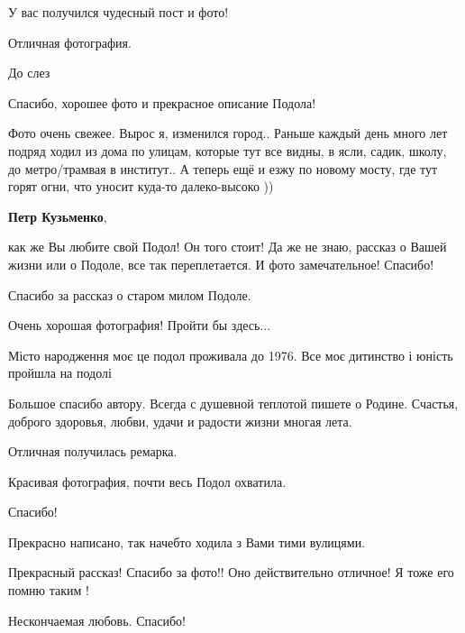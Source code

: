\begin{itemize}
У вас получился чудесный пост и фото!


Отличная фотография.

До слез

Спасибо, хорошее фото и прекрасное описание Подола!


Фото очень свежее. Вырос я, изменился город.. Раньше каждый день много лет
подряд ходил из дома по улицам, которые тут все видны, в ясли, садик, школу, до
метро/трамвая в институт.. А теперь ещё и езжу по новому мосту, где тут горят
огни, что уносит куда-то далеко-высоко ))


\textbf{Петр Кузьменко}, 

как же Вы любите свой Подол! Он того стоит! Да же не знаю, рассказ о Вашей
жизни или о Подоле, все так переплетается. И фото замечательное! Спасибо!

Спасибо за рассказ о старом милом Подоле.

Очень хорошая фотография! Пройти бы здесь...

Місто народження моє це подол проживала до 1976. Все моє дитинство і юність пройшла на подолі


Большое спасибо автору. Всегда с душевной теплотой пишете о Родине. Счастья,
доброго здоровья, любви, удачи и радости жизни многая лета.


Отличная получилась ремарка.

Красивая фотография, почти весь Подол охватила.

Спасибо!

Прекрасно написано, так начебто ходила з Вами тими вулицями.

Прекрасный рассказ! Спасибо за фото!! Оно действительно отличное! Я тоже его помню таким !

Нескончаемая любовь. Спасибо!

\end{itemize} %
